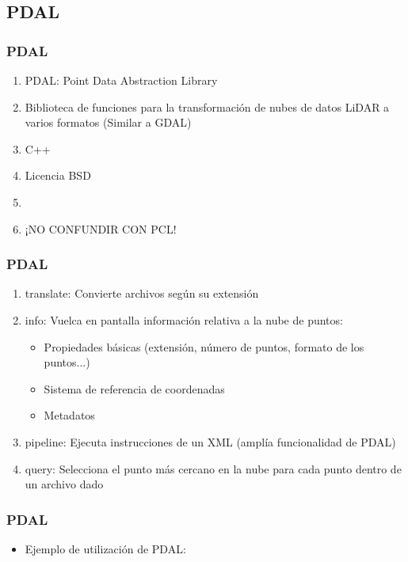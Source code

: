 \subsection{PDAL}
\begin{frame}
  \frametitle{PDAL}
  \begin{enumerate}
    \item \alert{PDAL}: \alert{P}oint \alert{D}ata \alert{A}bstraction
            \alert{L}ibrary
    \item Biblioteca de funciones para la transformación de nubes de datos LiDAR
      a varios formatos (Similar a GDAL)
    \item C++
    \item Licencia \alert{BSD}
    \item {}
    \item \alert{¡NO CONFUNDIR CON PCL!}
  \end{enumerate}
\end{frame}
\begin{frame}
  \frametitle{PDAL}
  \begin{enumerate}
    \item \alert{translate}: Convierte archivos según su extensión
    \item \alert{info}: Vuelca en pantalla información relativa a la nube de puntos:
      \begin{itemize}
        \item Propiedades básicas (extensión, número de puntos, formato de los puntos...) 
        \item Sistema de referencia de coordenadas
        \item Metadatos
      \end{itemize}
    \item \alert{pipeline}: Ejecuta instrucciones de un XML (amplía funcionalidad de PDAL) 
    \item \alert{query}: Selecciona el punto más cercano en la nube para cada punto dentro de un archivo dado
  \end{enumerate}
\end{frame}
\begin{frame}
  \frametitle{PDAL}
  \begin{itemize}
    \item Ejemplo de utilización de PDAL:
  \end{itemize}
  \pdaltools
\end{frame}
